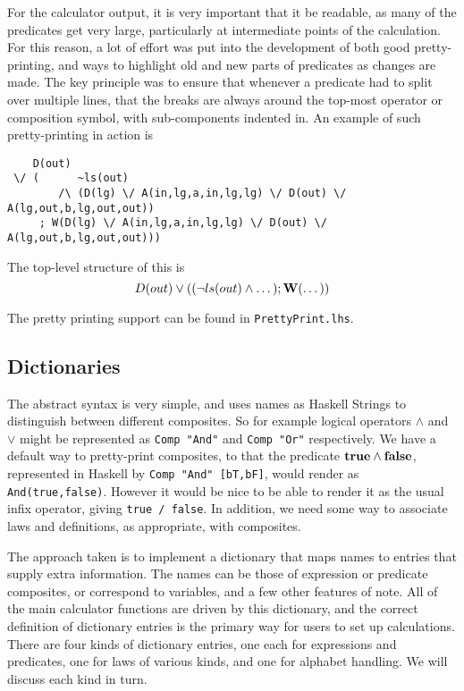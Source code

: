 For the calculator output,
it is very important that it be readable,
as many of the predicates get very large,
particularly at intermediate points of the calculation.
For this reason, a lot of effort was put into the development
of both good pretty-printing,
and ways to highlight old and new parts of predicates as changes are made.
The key principle was to ensure that whenever a predicate
had to split over multiple lines,
that the breaks are always around the top-most operator or composition
symbol, with sub-components indented in.
An example of such pretty-printing in action is
{\small
\begin{verbatim}
    D(out)
 \/ (      ~ls(out)
        /\ (D(lg) \/ A(in,lg,a,in,lg,lg) \/ D(out) \/ A(lg,out,b,lg,out,out))
     ; W(D(lg) \/ A(in,lg,a,in,lg,lg) \/ D(out) \/ A(lg,out,b,lg,out,out)))
\end{verbatim}
}
The top-level structure of this is
\[D(out) \lor ( (\lnot ls(out) \land \dots) ; \mathbf{W}(\dots) )\]

The pretty printing support can be found in \texttt{PrettyPrint.lhs}.

\subsection{Dictionaries}\label{ssec:dict}

The abstract syntax is very simple,
and uses names as Haskell Strings to distinguish between
different composites.
So for example logical operators $\land$ and $\lor$
might be represented as \texttt{Comp "And"} and \texttt{Comp "Or"}
respectively.
We have a default way to pretty-print composites,
to that the predicate $\mathbf{true} \land \mathbf{false}$,
represented in Haskell by \texttt{Comp "And" [bT,bF]},
would render as \texttt{And(true,false)}.
However it would be nice to be able to render it as the usual
infix operator, giving \texttt{true /\BS\ false}.
In addition, we need some way to associate laws and definitions,
as appropriate, with composites.

The approach taken is to implement a dictionary that maps names
to entries that supply extra information.
The names can be those of expression or predicate composites,
or correspond to variables, and a few other features of note.
All of the main calculator functions are driven by this
dictionary,
and the correct definition of dictionary entries
is the primary way for users to set up calculations.
There are four kinds of dictionary entries,
one each for expressions and predicates,
one for laws of various kinds,
and one for alphabet handling.
We will discuss each kind in turn.

